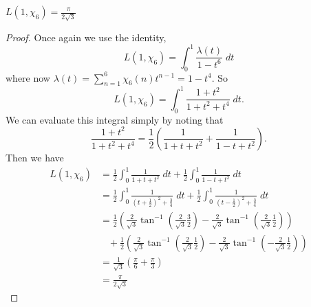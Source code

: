 \documentclass{unswmaths}
\begin{document}
    \begin{theorem}
        $L(1,\chi_6) = \frac{\pi}{2\sqrt{3}}$
    \end{theorem}
    \begin{proof}
        Once again we use the identity,
        \begin{equation*}
            L(1,\chi_6) = \int_0^1 \frac{\lambda(t)}{1-t^6}\;dt
        \end{equation*}
        where now $\lambda(t)= \sum_{n=1}^6 \chi_6(n)t^{n-1} = 1-t^4$. So
        \begin{equation*}
            L(1,\chi_6) = \int_0^1 \frac{1+t^2}{1+t^2+t^4}\;dt.
        \end{equation*}
        We can evaluate this integral simply by noting that
        \begin{equation*}
            \frac{1+t^2}{1+t^2+t^4} = \frac{1}{2}\left(\frac{1}{1+t+t^2}+\frac{1}{1-t+t^2}\right).
        \end{equation*}
        Then we have
        \begin{align*}
            L(1,\chi_6) &= \frac{1}{2}\int_0^1 \frac{1}{1+t+t^2}\;dt+\frac{1}{2}\int_0^1 \frac{1}{1-t+t^2}\;dt\\
            &= \frac{1}{2}\int_0^1 \frac{1}{\left(t+\frac{1}{2}\right)^2+\frac{3}{4}}\;dt+\frac{1}{2}\int_0^1 \frac{1}{\left(t-\frac{1}{2}\right)^2+\frac{3}{4}}\;dt\\
            &= \frac{1}{2}\left(\frac{2}{\sqrt{3}}\tan^{-1}\left(\frac{2}{\sqrt{3}}\frac{3}{2}\right)-\frac{2}{\sqrt{3}}\tan^{-1}\left(\frac{2}{\sqrt{3}}\frac{1}{2}\right)\right)\\
            &\;\;\;+\frac{1}{2}\left(\frac{2}{\sqrt{3}}\tan^{-1}\left(\frac{2}{\sqrt{3}}\frac{1}{2}\right)-\frac{2}{\sqrt{3}}\tan^{-1}\left(-\frac{2}{\sqrt{3}}\frac{1}{2}\right)\right)\\
            &= \frac{1}{\sqrt{3}}\left(\frac{\pi}{6}+\frac{\pi}{3}\right)\\
            &= \frac{\pi}{2\sqrt{3}}
        \end{align*}
    \end{proof}
\end{document}

